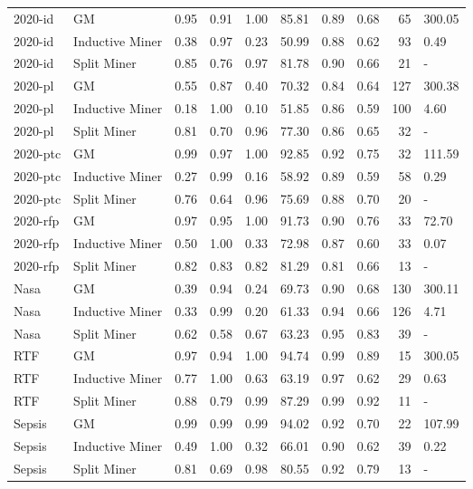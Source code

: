 \begin{tabular}{llrrrrrrrl}
2020-id & GM & 0.95 & 0.91 & 1.00 & 85.81 & 0.89 & 0.68 & 65 & 300.05 \\
2020-id & Inductive Miner & 0.38 & 0.97 & 0.23 & 50.99 & 0.88 & 0.62 & 93 & 0.49 \\
2020-id & Split Miner & 0.85 & 0.76 & 0.97 & 81.78 & 0.90 & 0.66 & 21 & - \\
2020-pl & GM & 0.55 & 0.87 & 0.40 & 70.32 & 0.84 & 0.64 & 127 & 300.38 \\
2020-pl & Inductive Miner & 0.18 & 1.00 & 0.10 & 51.85 & 0.86 & 0.59 & 100 & 4.60 \\
2020-pl & Split Miner & 0.81 & 0.70 & 0.96 & 77.30 & 0.86 & 0.65 & 32 & - \\
2020-ptc & GM & 0.99 & 0.97 & 1.00 & 92.85 & 0.92 & 0.75 & 32 & 111.59 \\
2020-ptc & Inductive Miner & 0.27 & 0.99 & 0.16 & 58.92 & 0.89 & 0.59 & 58 & 0.29 \\
2020-ptc & Split Miner & 0.76 & 0.64 & 0.96 & 75.69 & 0.88 & 0.70 & 20 & - \\
2020-rfp & GM & 0.97 & 0.95 & 1.00 & 91.73 & 0.90 & 0.76 & 33 & 72.70 \\
2020-rfp & Inductive Miner & 0.50 & 1.00 & 0.33 & 72.98 & 0.87 & 0.60 & 33 & 0.07 \\
2020-rfp & Split Miner & 0.82 & 0.83 & 0.82 & 81.29 & 0.81 & 0.66 & 13 & - \\
Nasa & GM & 0.39 & 0.94 & 0.24 & 69.73 & 0.90 & 0.68 & 130 & 300.11 \\
Nasa & Inductive Miner & 0.33 & 0.99 & 0.20 & 61.33 & 0.94 & 0.66 & 126 & 4.71 \\
Nasa & Split Miner & 0.62 & 0.58 & 0.67 & 63.23 & 0.95 & 0.83 & 39 & - \\
RTF & GM & 0.97 & 0.94 & 1.00 & 94.74 & 0.99 & 0.89 & 15 & 300.05 \\
RTF & Inductive Miner & 0.77 & 1.00 & 0.63 & 63.19 & 0.97 & 0.62 & 29 & 0.63 \\
RTF & Split Miner & 0.88 & 0.79 & 0.99 & 87.29 & 0.99 & 0.92 & 11 & - \\
Sepsis & GM & 0.99 & 0.99 & 0.99 & 94.02 & 0.92 & 0.70 & 22 & 107.99 \\
Sepsis & Inductive Miner & 0.49 & 1.00 & 0.32 & 66.01 & 0.90 & 0.62 & 39 & 0.22 \\
Sepsis & Split Miner & 0.81 & 0.69 & 0.98 & 80.55 & 0.92 & 0.79 & 13 & - \\
\bottomrule
\end{tabular}
